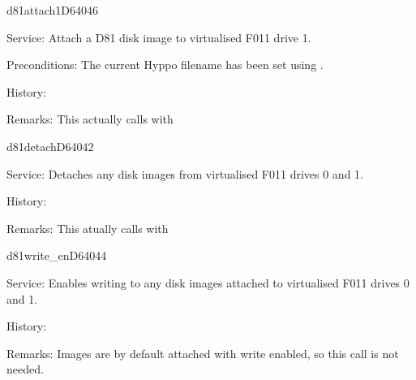 \begin{hyppotrap}{d81attach1}{D640}{46}
\item [Service:]
  Attach a D81 disk image to virtualised F011 drive 1.
\item [Preconditions:]
  The current Hyppo filename has been set using .
\item [History:]
  \\
\item [Remarks:]
  This actually calls  with 
\end{hyppotrap}


\begin{hyppotrap}{d81detach}{D640}{42}
\item [Service:]
  Detaches any disk images from virtualised F011 drives 0 and 1.
\item [History:]
  \\
\item [Remarks:]
  This atually calls  with 
\end{hyppotrap}


%
\begin{hyppotrap}{d81write\_en}{D640}{44}
\item [Service:]
  Enables writing to any disk images attached to virtualised F011 drives 0
  and 1.
\item [History:]
\item [Remarks:]
  Images are by default attached with write enabled, so this call is not needed.
\end{hyppotrap}



\newpage
